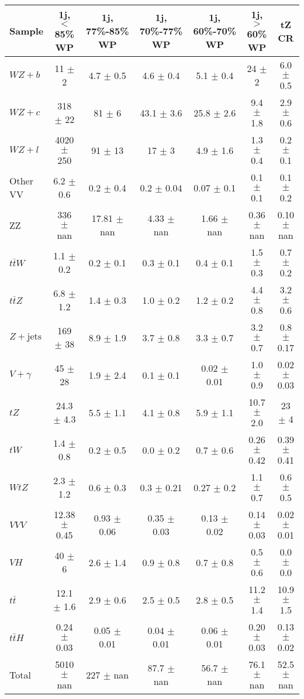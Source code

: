 \begin{tabular}{|l|c|c|c|c|c|c|}
\hline 
Sample & {1j, $<$85\% WP} & {1j, 77\%-85\% WP} & {1j, 70\%-77\% WP} & {1j, 60\%-70\% WP} & {1j, $>$60\% WP} & {tZ CR}\\
\hline 
  $WZ + b$   & 11 $\pm$ 2 & 4.7 $\pm$ 0.5 & 4.6 $\pm$ 0.4 & 5.1 $\pm$ 0.4 & 24 $\pm$ 2 & 6.0 $\pm$ 0.5 \\ 
  $WZ + c$   & 318 $\pm$ 22 & 81 $\pm$ 6 & 43.1 $\pm$ 3.6 & 25.8 $\pm$ 2.6 & 9.4 $\pm$ 1.8 & 2.9 $\pm$ 0.6 \\ 
  $WZ + l$   & 4020 $\pm$ 250 & 91 $\pm$ 13 & 17 $\pm$ 3 & 4.9 $\pm$ 1.6 & 1.3 $\pm$ 0.4 & 0.2 $\pm$ 0.1 \\ 
  Other VV   & 6.2 $\pm$ 0.6 & 0.2 $\pm$ 0.4 & 0.2 $\pm$ 0.04 & 0.07 $\pm$ 0.1 & 0.1 $\pm$ 0.1 & 0.1 $\pm$ 0.2 \\ 
  ZZ   & 336 $\pm$ nan & 17.81 $\pm$ nan & 4.33 $\pm$ nan & 1.66 $\pm$ nan & 0.36 $\pm$ nan & 0.10 $\pm$ nan \\ 
  $t\bar{t}W$   & 1.1 $\pm$ 0.2 & 0.2 $\pm$ 0.1 & 0.3 $\pm$ 0.1 & 0.4 $\pm$ 0.1 & 1.5 $\pm$ 0.3 & 0.7 $\pm$ 0.2 \\ 
  $t\bar{t}Z$   & 6.8 $\pm$ 1.2 & 1.4 $\pm$ 0.3 & 1.0 $\pm$ 0.2 & 1.2 $\pm$ 0.2 & 4.4 $\pm$ 0.8 & 3.2 $\pm$ 0.6 \\ 
  $Z+\text{jets}$   & 169 $\pm$ 38 & 8.9 $\pm$ 1.9 & 3.7 $\pm$ 0.8 & 3.3 $\pm$ 0.7 & 3.2 $\pm$ 0.7 & 0.8 $\pm$ 0.17 \\ 
  $V+\gamma$   & 45 $\pm$ 28 & 1.9 $\pm$ 2.4 & 0.1 $\pm$ 0.1 & 0.02 $\pm$ 0.01 & 1.0 $\pm$ 0.9 & 0.02 $\pm$ 0.03 \\ 
  $tZ$   & 24.3 $\pm$ 4.3 & 5.5 $\pm$ 1.1 & 4.1 $\pm$ 0.8 & 5.9 $\pm$ 1.1 & 10.7 $\pm$ 2.0 & 23 $\pm$ 4 \\ 
  $tW$   & 1.4 $\pm$ 0.8 & 0.2 $\pm$ 0.5 & 0.0 $\pm$ 0.2 & 0.7 $\pm$ 0.6 & 0.26 $\pm$ 0.42 & 0.39 $\pm$ 0.41 \\ 
  $WtZ$   & 2.3 $\pm$ 1.2 & 0.6 $\pm$ 0.3 & 0.3 $\pm$ 0.21 & 0.27 $\pm$ 0.2 & 1.1 $\pm$ 0.7 & 0.6 $\pm$ 0.5 \\ 
  $VVV$   & 12.38 $\pm$ 0.45 & 0.93 $\pm$ 0.06 & 0.35 $\pm$ 0.03 & 0.13 $\pm$ 0.02 & 0.14 $\pm$ 0.03 & 0.02 $\pm$ 0.01 \\ 
  $VH$   & 40 $\pm$ 6 & 2.6 $\pm$ 1.4 & 0.9 $\pm$ 0.8 & 0.7 $\pm$ 0.8 & 0.5 $\pm$ 0.6 & 0.0 $\pm$ 0.0 \\ 
  $t\bar{t}$   & 12.1 $\pm$ 1.6 & 2.9 $\pm$ 0.6 & 2.5 $\pm$ 0.5 & 2.8 $\pm$ 0.5 & 11.2 $\pm$ 1.4 & 10.9 $\pm$ 1.5 \\ 
  $t\bar{t}H$   & 0.24 $\pm$ 0.03 & 0.05 $\pm$ 0.01 & 0.04 $\pm$ 0.01 & 0.06 $\pm$ 0.01 & 0.20 $\pm$ 0.03 & 0.13 $\pm$ 0.02 \\ 
\hline 
  Total  & 5010 $\pm$ nan & 227 $\pm$ nan & 87.7 $\pm$ nan & 56.7 $\pm$ nan & 76.1 $\pm$ nan & 52.5 $\pm$ nan \\ 
\hline 
\end{tabular} 

